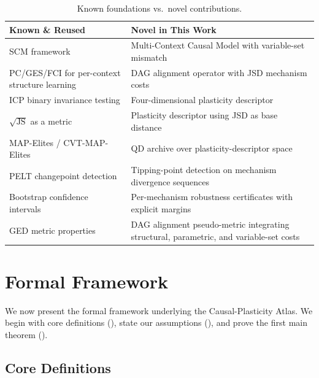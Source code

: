 \documentclass[11pt,a4paper]{article}
\theoremstyle{definition}
\newcommand{\JS}{\mathrm{JS}}                 %
\begin{document}
\begin{table}[ht]
\centering
\caption{Known foundations vs.\ novel contributions.}\label{tab:novelty}
\smallskip
\begin{tabular}{@{}p{}p{}@{}}
\toprule
\textbf{Known \& Reused} & \textbf{Novel in This Work} \\
\midrule
SCM framework \citep{pearl2009causality} &
  Multi-Context Causal Model with variable-set mismatch \\
PC/GES/FCI for per-context structure learning &
  DAG alignment operator with JSD mechanism costs \\
ICP binary invariance testing \citep{peters2016causal} &
  Four-dimensional plasticity descriptor \\
$\sqrt{\JS}$ as a metric \citep{endres2003new} &
  Plasticity descriptor using JSD as base distance \\
MAP-Elites / CVT-MAP-Elites \citep{mouret2015illuminating,vassiliades2018using} &
  QD archive over plasticity-descriptor space \\
PELT changepoint detection \citep{killick2012optimal} &
  Tipping-point detection on mechanism divergence sequences \\
Bootstrap confidence intervals \citep{friedman1999data} &
  Per-mechanism robustness certificates with explicit margins \\
GED metric properties \citep{gao2010survey} &
  DAG alignment pseudo-metric integrating structural, parametric, and variable-set costs \\
\bottomrule
\end{tabular}
\end{table}


\section{Formal Framework}\label{sec:framework}

We now present the formal framework underlying the Causal-Plasticity
Atlas.  We begin with core definitions (), state
our assumptions (), and prove the first main
theorem ().

\subsection{Core Definitions}\label{sec:core-defs}
\end{document}
